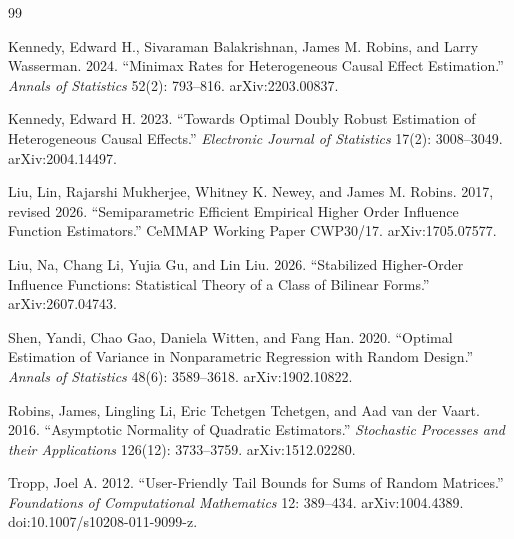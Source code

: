 \documentclass{article}
\begin{document}
\begin{thebibliography}{99}

   Kennedy, Edward H., Sivaraman Balakrishnan, James M. Robins, and Larry Wasserman. 2024. ``Minimax Rates for Heterogeneous Causal Effect Estimation.'' \emph{Annals of Statistics} 52(2): 793--816. arXiv:2203.00837.

   Kennedy, Edward H. 2023. ``Towards Optimal Doubly Robust Estimation of Heterogeneous Causal Effects.'' \emph{Electronic Journal of Statistics} 17(2): 3008--3049. arXiv:2004.14497.

   Liu, Lin, Rajarshi Mukherjee, Whitney K. Newey, and James M. Robins. 2017, revised 2026. ``Semiparametric Efficient Empirical Higher Order Influence Function Estimators.'' CeMMAP Working Paper CWP30/17. arXiv:1705.07577.

   Liu, Na, Chang Li, Yujia Gu, and Lin Liu. 2026. ``Stabilized Higher-Order Influence Functions: Statistical Theory of a Class of Bilinear Forms.'' arXiv:2607.04743.

   Shen, Yandi, Chao Gao, Daniela Witten, and Fang Han. 2020. ``Optimal Estimation of Variance in Nonparametric Regression with Random Design.'' \emph{Annals of Statistics} 48(6): 3589--3618. arXiv:1902.10822.

   Robins, James, Lingling Li, Eric Tchetgen Tchetgen, and Aad van der Vaart. 2016. ``Asymptotic Normality of Quadratic Estimators.'' \emph{Stochastic Processes and their Applications} 126(12): 3733--3759. arXiv:1512.02280.

   Tropp, Joel A. 2012. ``User-Friendly Tail Bounds for Sums of Random Matrices.'' \emph{Foundations of Computational Mathematics} 12: 389--434. arXiv:1004.4389. doi:10.1007/s10208-011-9099-z.

\end{thebibliography}
\end{document}
